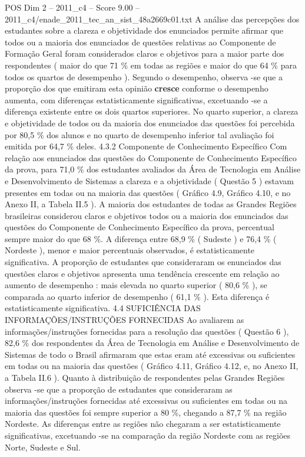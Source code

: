 \begin{textsample}{POS Dim 2 – 2011\_c4 – Score 9.00 – 2011\_c4/enade\_2011\_tec\_an\_sist\_48a2669c01.txt}
A análise das percepções dos estudantes sobre a clareza e objetividade dos enunciados permite afirmar que todos ou a maioria dos enunciados de questões relativas ao Componente de Formação Geral foram considerados claros e objetivos para a maior parte dos respondentes ( maior do que 71 \% em todas as regiões e maior do que 64 \% para todos os quartos de desempenho ).
Segundo o desempenho, observa -se que a proporção dos que emitiram esta opinião \textbf{cresce} conforme o desempenho aumenta, com diferenças estatisticamente significativas, excetuando -se a diferença existente entre os dois quartos superiores.
No quarto superior, a clareza e objetividade de todos ou da maioria dos enunciados das questões foi percebida por 80,5 \% dos alunos e no quarto de desempenho inferior tal avaliação foi emitida por 64,7 \% deles. 4.3.2 Componente de Conhecimento Específico Com relação aos enunciados das questões do Componente de Conhecimento Específico da prova, para 71,0 \% dos estudantes avaliados da Área de Tecnologia em Análise e Desenvolvimento de Sistemas a clareza e a objetividade ( Questão 5 ) estavam presentes em todas ou na maioria das questões ( Gráfico 4.9, Gráfico 4.10, e no Anexo II, a Tabela II.5 ).
A maioria dos estudantes de todas as Grandes Regiões brasileiras considerou claros e objetivos todos ou a maioria dos enunciados das questões do Componente de Conhecimento Específico da prova, percentual sempre maior do que 68 \%.
A diferença entre 68,9 \% ( Sudeste ) e 76,4 \% ( Nordeste ), menor e maior percentuais observados, é estatisticamente significativa.
A proporção de estudantes que consideraram os enunciados das questões claros e objetivos apresenta uma tendência crescente em relação ao aumento de desempenho : mais elevada no quarto superior ( 80,6 \% ), se comparada ao quarto inferior de desempenho ( 61,1 \% ).
Esta diferença é estatisticamente significativa. 4.4 SUFICIÊNCIA DAS INFORMAÇÕES/INSTRUÇÕES FORNECIDAS Ao avaliarem as informações/instruções fornecidas para a resolução das questões ( Questão 6 ), 82,6 \% dos respondentes da Área de Tecnologia em Análise e Desenvolvimento de Sistemas de todo o Brasil afirmaram que estas eram até excessivas ou suficientes em todas ou na maioria das questões ( Gráfico 4.11, Gráfico 4.12, e, no Anexo II, a Tabela II.6 ).
Quanto à distribuição de respondentes pelas Grandes Regiões observa -se que a proporção de estudantes que consideraram as informações/instruções fornecidas até excessivas ou suficientes em todas ou na maioria das questões foi sempre superior a 80 \%, chegando a 87,7 \% na região Nordeste.
As diferenças entre as regiões não chegaram a ser estatisticamente significativas, excetuando -se na comparação da região Nordeste com as regiões Norte, Sudeste e Sul.

\end{textsample}
